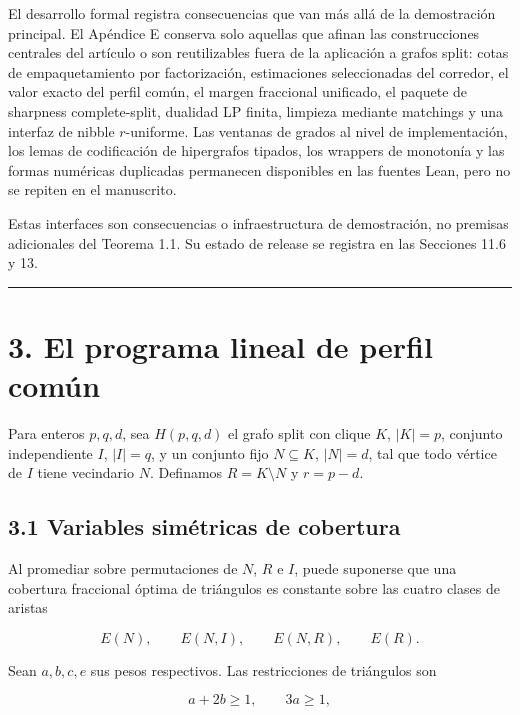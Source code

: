 \documentclass[
  spanish,
  11pt,
  a4paper,
]{article}
\begin{document}
El desarrollo formal registra consecuencias que van más allá de la demostración principal. El Apéndice E conserva solo aquellas que afinan las construcciones centrales del artículo o son reutilizables fuera de la aplicación a grafos split: cotas de empaquetamiento por factorización, estimaciones seleccionadas del corredor, el valor exacto del perfil común, el margen fraccional unificado, el paquete de sharpness complete-split, dualidad LP finita, limpieza mediante matchings y una interfaz de nibble \(r\)-uniforme. Las ventanas de grados al nivel de implementación, los lemas de codificación de hipergrafos tipados, los wrappers de monotonía y las formas numéricas duplicadas permanecen disponibles en las fuentes Lean, pero no se repiten en el manuscrito.

Estas interfaces son consecuencias o infraestructura de demostración, no premisas adicionales del Teorema 1.1. Su estado de release se registra en las Secciones 11.6 y 13.

\begin{center}\rule{0.5\linewidth}{0.5pt}\end{center}

\section{3. El programa lineal de perfil común}\label{el-programa-lineal-de-perfil-comuxfan}

Para enteros \(p,q,d\), sea \(H(p,q,d)\) el grafo split con clique \(K\), \(|K|=p\), conjunto independiente \(I\), \(|I|=q\), y un conjunto fijo \(N\subseteq K\), \(|N|=d\), tal que todo vértice de \(I\) tiene vecindario \(N\). Definamos \(R=K\setminus N\) y \(r=p-d\).

\subsection{3.1 Variables simétricas de cobertura}\label{variables-simuxe9tricas-de-cobertura}

Al promediar sobre permutaciones de \(N\), \(R\) e \(I\), puede suponerse que una cobertura fraccional óptima de triángulos es constante sobre las cuatro clases de aristas

\[
E(N),
\qquad E(N,I),
\qquad E(N,R),
\qquad E(R).
\]

Sean \(a,b,c,e\) sus pesos respectivos. Las restricciones de triángulos son

\[
a+2b\ge1,
\qquad
3a\ge1,
\tag{3.1}
\]
\end{document}
